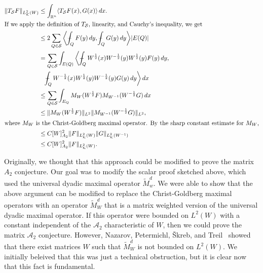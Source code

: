 \documentclass[12pt]{amsart}
\theoremstyle{definition}
\theoremstyle{remark}
\numberwithin{equation}{section}
\newcommand{\rn}{{{\mathbb R}^n}}
\newcommand{\Ss}{\mathcal S}
\newcommand{\A}{\mathcal A}
\newcommand{\K}{\mathcal K}
\def\Xint#1{\mathchoice
   {\XXint\displaystyle\textstyle{#1}}%
   {\XXint\textstyle\scriptstyle{#1}}%
   {\XXint\scriptstyle\scriptscriptstyle{#1}}%
   {\XXint\scriptscriptstyle\scriptscriptstyle{#1}}%
   \!\int}
\def\XXint#1#2#3{{\setbox0=\hbox{$#1{#2#3}{\int}$}
     \vcenter{\hbox{$#2#3$}}\kern-.5\wd0}}
\def\avgint{\Xint-}
\begin{document}
 \begin{align*}
    \|T_\Ss F\|_{L^2_\K(W)}
   & \leq \int_{\rn} \langle T_\Ss F(x), G(x)\rangle \,dx.   \\
 \intertext{If we apply the definition of $T_\Ss$, linearity, and
   Cauchy's inequality, we get}
  & \leq 2 \sum_{Q\in \Ss}
      \bigg\langle \avgint_Q F(y)\,dy, \avgint_Q G(y)\,dy
      \bigg\rangle |E(Q)| \\
   & = \sum_{Q\in \Ss}
      \int_{E(Q)} \bigg\langle  \avgint_Q
      W^{\frac12}(x)W^{-\frac12}(y) W^{\frac12}(y)F(y)\,dy, \\
& \quad       \avgint_Q
      W^{-\frac12}(x)W^{\frac12}(y) W^{-\frac12}(y)G(y)\,dy
                                                                 \bigg\rangle
                                                                 \,dx \\
    & \leq \sum_{Q\in \Ss} \int_{E_Q}  M_{W}(W^{\frac12}F)
      M_{W^{-1}}(W^{-\frac12}G)\,dx \\
   & \leq \|M_{W}(W^{\frac12}F)\|_{L^2}
     \|M_{W^{-1}}(W^{-\frac12}G)\|_{L^2},\\
   \intertext{where $M_W$ is the Christ-Goldberg maximal operator.
   By the sharp constant estimate for $M_W$,}
   & \leq C[W]_{A_2}^2 \|F\|_{L^2_\K(W)}
     \|G\|_{L^2_\K(W^{-1})} \\
   & \leq C[W]_{A_2}^2 \|F\|_{L^2_\K(W)}.
  \end{align*}

  Originally, we thought that this approach could be modified to prove
  the matrix $A_2$ conjecture.  Our goal was to modify the scalar proof sketched above, which used the
  universal dyadic maximal operator $\tilde{M}^d_w$.  We were able to  show
  that the above argument can be modified to replace the
  Christ-Goldberg maximal operators with an operator $\tilde{M}_W^d$
  that is a matrix weighted version of the universal dyadic maximal
  operator.  If this operator were bounded on $L^2(W)$ with a constant
  independent of the $\A_2$ characteristic of $W$, then we could prove
  the matrix $\A_2$ conjecture.  However, Nazarov, Petermichl,
  \v{S}kreb, and Treil~\cite{NPST-2022} showed that there
  exist matrices $W$ such that $\tilde{M}_W^d$ is not bounded on
  $L^2(W)$.   We initially beleived that this was just a technical
  obstruction, but it is clear now that this fact is fundamental.  




\end{document}
